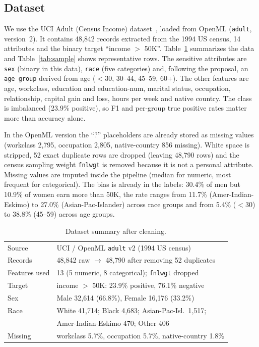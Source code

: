 \documentclass[conference]{IEEEtran}
\begin{document}
\subsection{Dataset}
We use the UCI Adult (Census Income) dataset~\cite{kohavi1996,dua2019}, loaded from OpenML (\texttt{adult}, version~2). It contains 48{,}842 records extracted from the 1994 US census, 14 attributes and the binary target ``income $>$ 50K''. Table~\ref{tab:data} summarizes the data and Table~\ref{tab:sample} shows representative rows. The sensitive attributes are \texttt{sex} (binary in this data), \texttt{race} (five categories) and, following the proposal, an \texttt{age group} derived from age ($<$30, 30--44, 45--59, 60+). The other features are age, workclass, education and education-num, marital status, occupation, relationship, capital gain and loss, hours per week and native country. The class is imbalanced (23.9\% positive), so F1 and per-group true positive rates matter more than accuracy alone.

In the OpenML version the ``?'' placeholders are already stored as missing values (workclass 2{,}795, occupation 2{,}805, native-country 856 missing). White space is stripped, 52 exact duplicate rows are dropped (leaving 48{,}790 rows) and the census sampling weight \texttt{fnlwgt} is removed because it is not a personal attribute. Missing values are imputed inside the pipeline (median for numeric, most frequent for categorical). The bias is already in the labels: 30.4\% of men but 10.9\% of women earn more than 50K, the rate ranges from 11.7\% (Amer-Indian-Eskimo) to 27.0\% (Asian-Pac-Islander) across race groups and from 5.4\% ($<$30) to 38.8\% (45--59) across age groups.

\begin{table}[t]
\caption{Dataset summary after cleaning.}
\label{tab:data}
\centering\scriptsize
\begin{tabular}{ll}
\toprule
Source & UCI / OpenML \texttt{adult} v2 (1994 US census) \\
Records & 48{,}842 raw $\rightarrow$ 48{,}790 after removing 52 duplicates \\
Features used & 13 (5 numeric, 8 categorical); \texttt{fnlwgt} dropped \\
Target & income $>$ 50K: 23.9\% positive, 76.1\% negative \\
Sex & Male 32{,}614 (66.8\%), Female 16{,}176 (33.2\%) \\
Race & White 41{,}714; Black 4{,}683; Asian-Pac-Isl.\ 1{,}517; \\
     & Amer-Indian-Eskimo 470; Other 406 \\
Missing & workclass 5.7\%, occupation 5.7\%, native-country 1.8\% \\
\bottomrule
\end{tabular}
\end{table}
\end{document}

